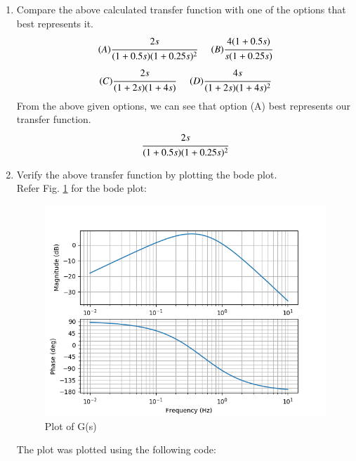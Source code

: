 \begin{enumerate}[label=\thesection.\arabic*.,ref=\thesection.\theenumi]
\item Compare the above calculated transfer function with one of the options that best represents it.
\begin{multline*}
    (A) \cfrac{2s}{(1+0.5s)(1+0.25s)^2}\hspace{0.5cm}
    (B) \cfrac{4(1+0.5s)}{s(1+0.25s)}
\end{multline*}
\begin{multline*}
    (C) \cfrac{2s}{(1+2s)(1+4s)}\hspace{0.5cm}
    (D) \cfrac{4s}{(1+2s)(1+4s)^2}
\end{multline*}
\solution
From the above given options, we can see that option (A) best represents our transfer function.
\begin{align*}
     \cfrac{2s}{(1+0.5s)(1+0.25s)^2}
\end{align*}{}


\item Verify the above transfer function by plotting the bode plot.
\\
\solution
Refer Fig. \ref{fig:ep18btech11016_fig2} for the bode plot:
\begin{center}
    \begin{figure}[!h]
    \centering
    \includegraphics[width=\columnwidth]{./figs/ep18btech11016_fig2.png}
    \caption{Plot of G(s)}
    \label{fig:ep18btech11016_fig2}
    \end{figure}
\end{center}

The plot was plotted using the following code:


\end{enumerate}
